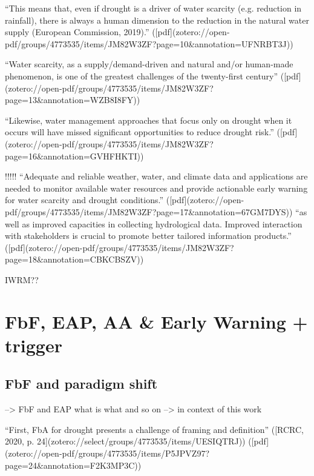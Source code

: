 {“This means that, even if drought is a driver of water scarcity (e.g. reduction in rainfall), there is always a human dimension to the reduction in the natural water supply (European Commission, 2019).” ([pdf](zotero://open-pdf/groups/4773535/items/JM82W3ZF?page=10&annotation=UFNRBT3J))

“Water scarcity, as a supply/demand-driven and natural and/or human-made phenomenon, is one of the greatest challenges of the twenty-first century” ([pdf](zotero://open-pdf/groups/4773535/items/JM82W3ZF?page=13&annotation=WZB8I8FY))

“Likewise, water management approaches that focus only on drought when it occurs will have missed significant opportunities to reduce drought risk.” ([pdf](zotero://open-pdf/groups/4773535/items/JM82W3ZF?page=16&annotation=GVHFHKTI))


!!!!!
“Adequate and reliable weather, water, and climate data and applications are needed to monitor available water resources and provide actionable early warning for water scarcity and drought conditions.” ([pdf](zotero://open-pdf/groups/4773535/items/JM82W3ZF?page=17&annotation=67GM7DYS))
“as well as improved capacities in collecting hydrological data. Improved interaction with stakeholders is crucial to promote better tailored information products.” ([pdf](zotero://open-pdf/groups/4773535/items/JM82W3ZF?page=18&annotation=CBKCBSZV))


IWRM??



\section{FbF, EAP, AA & Early Warning + trigger}

\subsection{FbF and paradigm shift}
--> FbF and EAP what is what and so on --> in context of this work


“First, FbA for drought presents a challenge of framing and definition” ([RCRC, 2020, p. 24](zotero://select/groups/4773535/items/UESIQTRJ)) ([pdf](zotero://open-pdf/groups/4773535/items/P5JPVZ97?page=24&annotation=F2K3MP3C))

}
